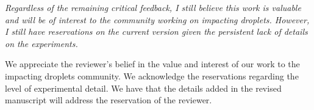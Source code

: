 \documentclass[]{article}
\begin{document}
\textit{Regardless of the remaining critical feedback, I still believe this work is valuable and will be of interest to the community working on impacting droplets. However, I still have reservations on the current version given the persistent lack of details on the experiments.}

We appreciate the reviewer's belief in the value and interest of our work to the impacting droplets community. We acknowledge the reservations regarding the level of experimental detail. We have that the details added in the revised manuscript will address the reservation of the reviewer. 
	
\printbibliography[title=References]
\end{document}

